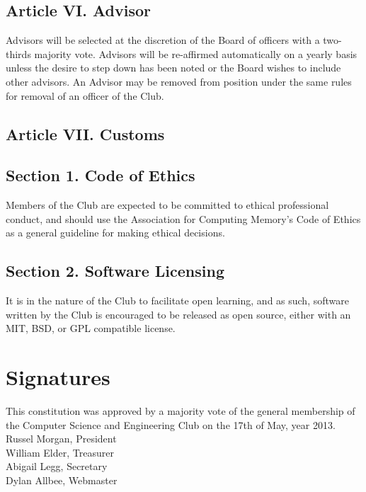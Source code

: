 \documentclass{article}
\begin{document}
  \subsection{Article VI. Advisor}
    Advisors will be selected at the discretion of the Board of officers with a two-thirds majority vote. Advisors will be re-affirmed automatically on a yearly basis unless the desire to step down has been noted or the Board wishes to include other advisors. An Advisor may be removed from position under the same rules for removal of an officer of the Club.

  \subsection{Article VII. Customs}
    \subsection{Section 1. Code of Ethics}
      Members of the Club are expected to be committed to ethical professional conduct, and should use the Association for Computing Memory's Code of Ethics as a general guideline for making ethical decisions.
    \subsection{Section 2. Software Licensing}
      It is in the nature of the Club to facilitate open learning, and as such, software written by the Club is encouraged to be released as open source, either with an MIT, BSD, or GPL compatible license. 

  \section{Signatures}
    This constitution was approved by a majority vote of the general membership of the Computer Science and Engineering Club on the 17th of May, year 2013.\\[0.15in]
    
    	Russel Morgan, President\\[0.15in]


      William Elder, Treasurer\\[0.15in]


      Abigail Legg, Secretary\\[0.15in]


      Dylan Allbee, Webmaster
  
\end{document}
